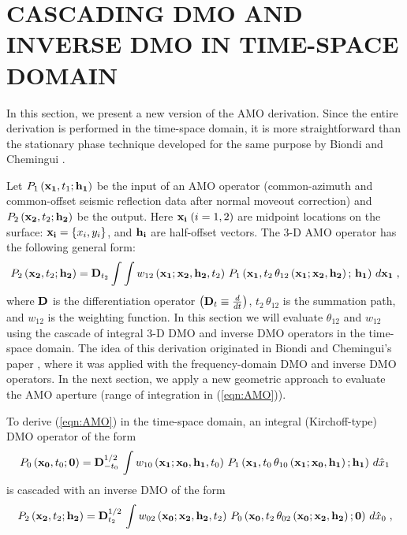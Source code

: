 \section{CASCADING DMO AND INVERSE DMO
IN TIME-SPACE DOMAIN}
In this section, we present a new version of the AMO derivation.
Since 
the entire derivation is performed in the time-space domain, it is more
straightforward than the stationary phase technique developed for the
same purpose by Biondi and Chemingui .
\par
Let $P_1\left({\bf x_1},t_1;{\bf h_1}\right)$ be the in\-put of an AMO
ope\-ra\-tor  (com\-mon-azi\-muth and com\-mon-off\-set seismic
reflection data after normal moveout correction) and 
$P_2\left({\bf x_2},t_2;{\bf h_2}\right)$ be the output. Here 
${\bf x_i}\; (i=1,2)$ are midpoint locations on the surface:
${\bf x_i}=\left\{x_i,y_i\right\}$, and 
${\bf h_i}$ are half-offset vectors.
The 3-D AMO operator has the following general form:
\begin{equation} 
P_2\left({\bf x_2},t_2;{\bf h_2}\right)  =  {\bf D}_{t_2} \int\int 
w_{12}\left({\bf x_1;x_2,h_2},t_2\right)\,
P_1\left({\bf x_1},
t_2\,\theta_{12}\left({\bf x_1;x_2, h_2}\right);\,
{\bf h_1}\right)\,d{\bf x_1}\;,
\label{eqn:AMO}
\end{equation}
where ${\bf D}$ is the differentiation operator $\left({\bf
D}_t\equiv{d \over dt}\right)$, $t_2\,\theta_{12}$ is the summation
path, and $w_{12}$ is the weighting function. In this section we will
evaluate $\theta_{12}$ and $w_{12}$ using the cascade of integral 3-D DMO and
inverse DMO operators in the time-space domain. The idea of this
derivation originated in Biondi and Chemingui's paper
, where it was  
applied with the frequency-domain DMO and inverse DMO operators. In
the next section, 
we apply a new geometric approach to evaluate the AMO aperture (range of
integration in (\ref{eqn:AMO})). 
\par
To derive (\ref{eqn:AMO}) in the time-space domain, 
an integral
(Kirchoff-type) DMO operator of the form
\begin{equation}
P_0\left({\bf x_0},t_0;{\bf 0}\right)={\bf D}_{-t_0}^{1/2}\,\int 
w_{10}\left({\bf x_1;x_0,h_1},t_0\right)\,
P_1\left({\bf x_1},t_0\,\theta_{10}\left({\bf x_1;x_0,h_1}\right);
{\bf h_1}\right)\,d\hat{x}_1
\label{eqn:DMO}
\end{equation}
is cascaded with an inverse DMO of the form
\begin{equation}
P_2\left({\bf x_2},t_2;{\bf h_2}\right)={\bf D}_{t_2}^{1/2}\,\int 
w_{02}\left({\bf x_0;x_2, h_2},t_2\right)\,
P_0\left({\bf x_0},t_2\,\theta_{02}\left({\bf x_0;x_2, h_2}\right);
{\bf 0}\right)\,d\hat{x}_0\;,
\label{eqn:IDMO}
\end{equation}
